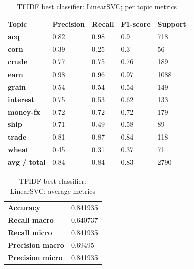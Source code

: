 \documentclass{article}
\begin{document}
\begin{table}[H]
\label{tab:title}
\begin{tabular}{l|llll}
\textbf{Topic}       & \textbf{Precision} & \textbf{Recall} & \textbf{F1-score} & \textbf{Support} \\ \hline
\textbf{acq}         & 0.82               & 0.98            & 0.9               & 718              \\
\textbf{corn}        & 0.39               & 0.25            & 0.3               & 56               \\
\textbf{crude}       & 0.77               & 0.75            & 0.76              & 189              \\
\textbf{earn}        & 0.98               & 0.96            & 0.97              & 1088             \\
\textbf{grain}       & 0.54               & 0.54            & 0.54              & 149              \\
\textbf{interest}    & 0.75               & 0.53            & 0.62              & 133              \\
\textbf{money-fx}    & 0.72               & 0.72            & 0.72              & 179              \\
\textbf{ship}        & 0.71               & 0.49            & 0.58              & 89               \\
\textbf{trade}       & 0.81               & 0.87            & 0.84              & 118              \\
\textbf{wheat}       & 0.45               & 0.31            & 0.37              & 71               \\ \hline
\textbf{avg / total} & 0.84               & 0.84            & 0.83              & 2790             \\
\end{tabular}
\caption {TFIDF best classifier: LinearSVC; per topic metrics}
\end{table}

\begin{table}[H]
\begin{tabular}{l|l}
\textbf{Accuracy}        & 0.841935 \\
\textbf{Recall macro}    & 0.640737 \\
\textbf{Recall micro}    & 0.841935 \\
\textbf{Precision macro} & 0.69495  \\
\textbf{Precision micro} & 0.841935
\end{tabular}
\caption {TFIDF best classifier: LinearSVC; average metrics}
\end{table}
\end{document}
